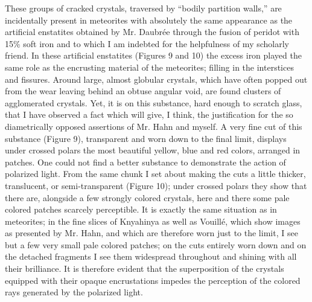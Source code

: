 \documentclass[a4paper, 12pt, oneside]{article}
\begin{document}
These groups of cracked crystals, traversed by ``bodily partition walls,'' are incidentally present in meteorites with absolutely the same appearance as the artificial enstatites obtained by Mr. Daubrée through the fusion of peridot with 15\% soft iron and to which I am indebted for the helpfulness of my scholarly friend. In these artificial enstatites (Figures 9 and 10) the excess iron played the same role as the encrusting material of the meteorites; filling in the interstices and fissures. Around large, almost globular crystals, which have often popped out from the wear leaving behind an obtuse angular void, are found clusters of agglomerated crystals. Yet, it is on this substance, hard enough to scratch glass, that I have observed a fact which will give, I think, the justification for the so diametrically opposed assertions of Mr. Hahn and myself. A very fine cut of this substance (Figure 9), transparent and worn down to the final limit, displays under crossed polars the most beautiful yellow, blue and red colors, arranged in patches. One could not find a better substance to demonstrate the action of polarized light. From the same chunk I set about making the cuts a little thicker, translucent, or semi-transparent (Figure 10); under crossed polars they show that there are, alongside a few strongly colored crystals, here and there some pale colored patches scarcely perceptible. It is exactly the same situation as in meteorites; in the fine slices of Knyahinya as well as Vouillé, which show images as presented by Mr. Hahn, and which are therefore worn just to the limit, I see but a few very small pale colored patches; on the cuts entirely worn down and on the detached fragments I see them widespread throughout and shining with all their brilliance. It is therefore evident that the superposition of the crystals equipped with their opaque encrustations impedes the perception of the colored rays generated by the polarized light.
\end{document}
